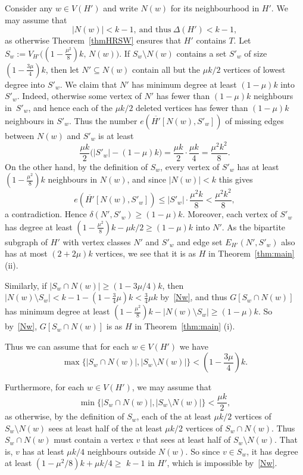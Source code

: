 \documentclass[12pt]{article}
\begin{document}
Consider any $w \in V(H')$ and write $N(w)$ for its neighbourhood in $H'$. We may assume that 
\begin{equation}\label{Nw}
|N(w)|<k-1, \ \text{and thus} \ \Delta(H')<k-1,
\end{equation}
as otherwise  Theorem~\ref{thmHRSW} 
ensures that $H'$ contains $T$.
Let $S_w:=V_{H'}\big((1-\frac{\mu^2}{8})k,\, N(w)\big)$.
If $S_w\setminus N(w)$ contains a set $S'_w$ of size $(1-\frac{3\mu}{4})k$, then
let $N'\subseteq N(w)$ contain all but the $\mu k/2$ vertices of lowest degree into $S'_w$.
We claim that $N'$ has minimum degree at least $(1-\mu)k$ into~$S'_w$.
Indeed, otherwise some vertex of $N'$ has fewer than $(1-\mu)k$ neighbours in~$S'_w$, and hence
each of the $\mu k/2$ deleted vertices has fewer than $(1-\mu)k$ neighbours in $S'_w$.
Thus the number $e(\overline{H'}[N(w),S'_w])$ of missing edges between $N(w)$ and $S'_w$ is at least
\[
\frac{\mu k}{2}\big(|S'_w|-(1-\mu)k\big)=\frac{\mu k}{2}\cdot \frac{\mu k}{4}=\frac{\mu^2k^2}{8}.
\]
On the other hand, by the definition of $S_w$, every vertex of $S'_w$ has at least
$(1-\frac{\mu^2}{8})k$ neighbours in $N(w)$, and since $|N(w)|<k$ this gives
\[
e(\overline{H'}[N(w),S'_w])\le |S'_w|\cdot \frac{\mu^2k}{8}<\frac{\mu^2k^2}{8},
\]
a contradiction. Hence $\delta(N',S'_w)\ge (1-\mu)k$.
Moreover, each vertex of $S'_w$ has degree at least
$(1-\frac{\mu^2}{8})k-\mu k/2\ge (1-\mu)k$ into $N'$.
 As the bipartite subgraph of $H'$ with vertex classes $N'$ and $S'_w$
and edge set $E_{H'}(N',S'_w)$
also has at most $(2+2\mu)k$ vertices, we see that it is as  $H$ in Theorem~\ref{thm:main} (ii). 
 
 Similarly, if 
 $|S_w\cap N(w)|\ge (1-3\mu/4)k$, then 
$|N(w)\setminus S_w|<k-1-(1-\frac 34\mu)k < \frac 34\mu k$ by~\eqref{Nw}, 
and thus
$G[S_w\cap N(w)]$ has minimum degree at least 
 $(1-\frac{\mu^2}8)k-|N(w)\setminus S_w|\ge(1-\mu)k.$ 
 So by~\eqref{Nw}, $G[S_w\cap N(w)]$ is as  $H$ in Theorem~\ref{thm:main} (i). 
 

 Thus we can assume that for each $w \in V(H')$ we have
\begin{equation}\label{Swmax}
\max\{|S_w\cap N(w)|, |S_w\setminus N(w)|\}< (1-\frac{3\mu}4)k.
\end{equation}

Furthermore, for each $w \in V(H')$, we may assume that
 \begin{equation}\label{Swmin}
\min\{|S_w\cap N(w)|, |S_w\setminus N(w)|\}< \frac{\mu k}2,
\end{equation}
as otherwise, by the definition of $S_w$, each of the at least $\mu k/2$ vertices of $S_w\setminus N(w)$ sees at least half of the at least $\mu k/2$ vertices of $S_w\cap N(w)$. Thus $S_w\cap N(w)$ must contain a vertex $v$ that sees at least half of $S_w\setminus N(w)$. That is, $v$ has at least $\mu k/4$ neighbours outside $N(w)$. So since $v\in S_w$, it has degree at least 
$(1-\mu^2/8)k + \mu k/4\ge $
$k-1$ in $H'$, which is impossible by~\eqref{Nw}.
\end{document}
